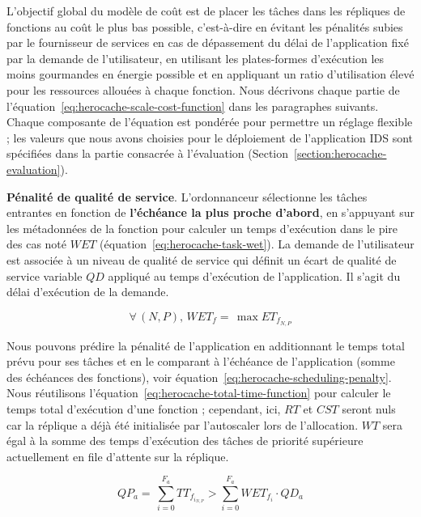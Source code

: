 L'objectif global du modèle de coût est de placer les tâches dans les répliques de fonctions au coût le plus bas possible, c'est-à-dire en évitant les pénalités subies par le fournisseur de services en cas de dépassement du délai de l'application fixé par la demande de l'utilisateur, en utilisant les plates-formes d'exécution les moins gourmandes en énergie possible et en appliquant un ratio d'utilisation élevé pour les ressources allouées à chaque fonction. Nous décrivons chaque partie de l'équation~\ref{eq:herocache-scale-cost-function} dans les paragraphes suivants. Chaque composante de l'équation est pondérée pour permettre un réglage flexible ; les valeurs que nous avons choisies pour le déploiement de l'application IDS sont spécifiées dans la partie consacrée à l'évaluation (Section~\ref{section:herocache-evaluation}).

\textbf{Pénalité de qualité de service}. L'ordonnanceur sélectionne les tâches entrantes en fonction de \textbf{l'échéance la plus proche d'abord}, en s'appuyant sur les métadonnées de la fonction pour calculer un temps d'exécution dans le pire des cas noté $WET$ (équation~\ref{eq:herocache-task-wet}). La demande de l'utilisateur est associée à un niveau de qualité de service qui définit un écart de qualité de service variable $QD$ appliqué au temps d'exécution de l'application. Il s'agit du délai d'exécution de la demande.

\begin{equation}
    \forall \, (N, P), \, WET_{f} = \, \max ET_{f_{N, P}}
\label{eq:herocache-task-wet}
\end{equation}

Nous pouvons prédire la pénalité de l'application en additionnant le temps total prévu pour ses tâches et en le comparant à l'échéance de l'application (somme des échéances des fonctions), voir équation~\ref{eq:herocache-scheduling-penalty}. Nous réutilisons l'équation~\ref{eq:herocache-total-time-function} pour calculer le temps total d'exécution d'une fonction ; cependant, ici, $RT$ et $CST$ seront nuls car la réplique a déjà été initialisée par l'autoscaler lors de l'allocation. $WT$ sera égal à la somme des temps d'exécution des tâches de priorité supérieure actuellement en file d'attente sur la réplique.

\begin{equation}
   QP_{a} = \, \sum_{i = 0}^{F_a} TT_{{f}_{{i}_{N, P}}} > \sum_{i = 0}^{F_a} WET_{f_{i}} \cdot QD_{a}
\label{eq:herocache-scheduling-penalty}
\end{equation}

